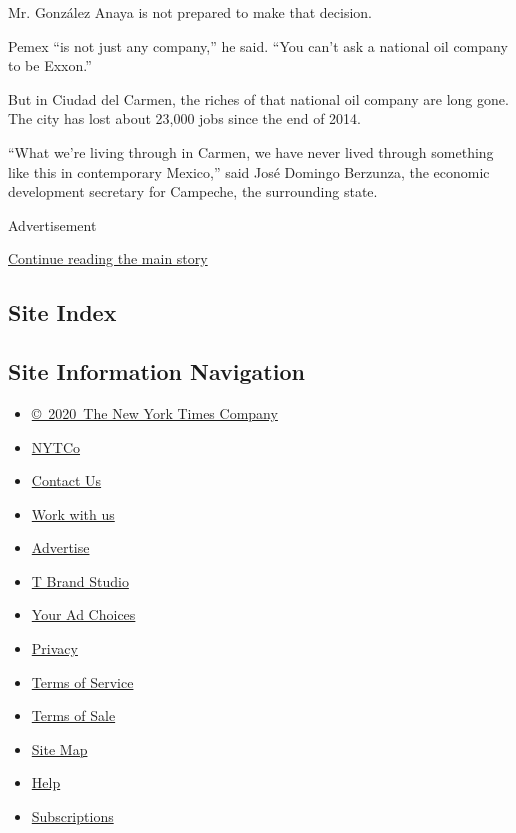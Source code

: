 Mr. González Anaya is not prepared to make that decision.

Pemex ``is not just any company,'' he said. ``You can't ask a national
oil company to be Exxon.''

But in Ciudad del Carmen, the riches of that national oil company are
long gone. The city has lost about 23,000 jobs since the end of 2014.

``What we're living through in Carmen, we have never lived through
something like this in contemporary Mexico,'' said José Domingo
Berzunza, the economic development secretary for Campeche, the
surrounding state.

Advertisement

\protect\hyperlink{after-bottom}{Continue reading the main story}

\hypertarget{site-index}{%
\subsection{Site Index}\label{site-index}}

\hypertarget{site-information-navigation}{%
\subsection{Site Information
Navigation}\label{site-information-navigation}}

\begin{itemize}
\tightlist
\item
  \href{https://help.nytimes.com/hc/en-us/articles/115014792127-Copyright-notice}{©~2020~The
  New York Times Company}
\end{itemize}

\begin{itemize}
\tightlist
\item
  \href{https://www.nytco.com/}{NYTCo}
\item
  \href{https://help.nytimes.com/hc/en-us/articles/115015385887-Contact-Us}{Contact
  Us}
\item
  \href{https://www.nytco.com/careers/}{Work with us}
\item
  \href{https://nytmediakit.com/}{Advertise}
\item
  \href{http://www.tbrandstudio.com/}{T Brand Studio}
\item
  \href{https://www.nytimes.com/privacy/cookie-policy\#how-do-i-manage-trackers}{Your
  Ad Choices}
\item
  \href{https://www.nytimes.com/privacy}{Privacy}
\item
  \href{https://help.nytimes.com/hc/en-us/articles/115014893428-Terms-of-service}{Terms
  of Service}
\item
  \href{https://help.nytimes.com/hc/en-us/articles/115014893968-Terms-of-sale}{Terms
  of Sale}
\item
  \href{https://spiderbites.nytimes.com}{Site Map}
\item
  \href{https://help.nytimes.com/hc/en-us}{Help}
\item
  \href{https://www.nytimes.com/subscription?campaignId=37WXW}{Subscriptions}
\end{itemize}
